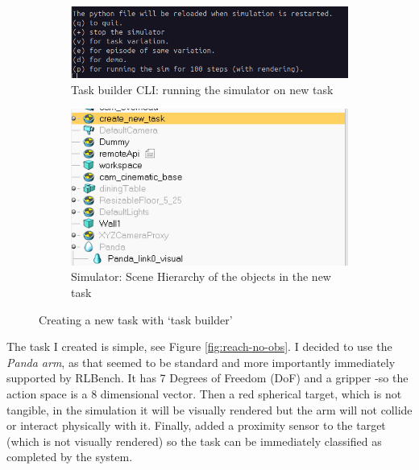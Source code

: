 \begin{figure}[htbp]
  \begin{subfigure}{0.48\linewidth}
    \centering
    \includegraphics[width=0.8\linewidth]{assets/early-work/task-builder-cli-2.png}
    \caption{Task builder CLI: running the simulator on new task}
  \end{subfigure}
  \hfill
  \begin{subfigure}{0.48\textwidth}
    \centering
    \includegraphics[width=0.8\linewidth]{assets/early-work/task-builder-scene-hierarchy.png}
    \caption{Simulator: Scene Hierarchy of the objects in the new task}
  \end{subfigure}
  \caption{Creating a new task with `task builder'}\label{fig:task-builder}
\end{figure}


The task I created is simple, see Figure \ref{fig:reach-no-obs}. I decided to use the \emph{Panda arm}, as that seemed to be standard and more importantly immediately supported by RLBench. It has 7 Degrees of Freedom (DoF) and a gripper -so the action space is a 8 dimensional vector. Then a red spherical target, which is not tangible, in the simulation it will be visually rendered but the arm will not collide or interact physically with it. Finally, added a proximity sensor to the target (which is not visually rendered) so the task can be immediately classified as completed by the system.



